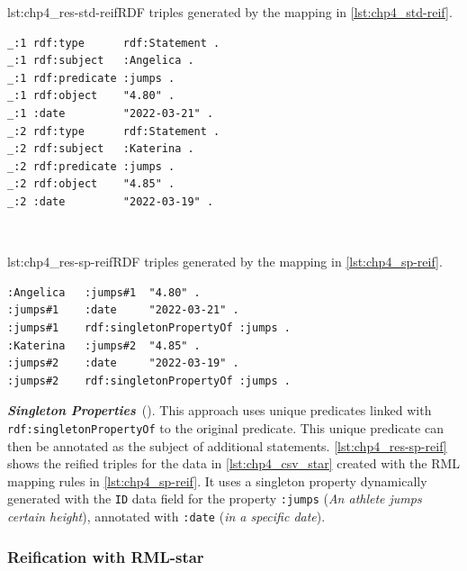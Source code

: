 \begin{minipage}{0.42\linewidth}
\begin{captionedlisting}{lst:chp4_res-std-reif}{RDF triples generated by the mapping in \cref{lst:chp4_std-reif}.}
\centering
{\begin{lstlisting}[basicstyle=\ttfamily\small,label={list:example1},columns=flexible]
_:1 rdf:type      rdf:Statement .
_:1 rdf:subject   :Angelica .
_:1 rdf:predicate :jumps .
_:1 rdf:object    "4.80" .
_:1 :date         "2022-03-21" .
_:2 rdf:type      rdf:Statement .
_:2 rdf:subject   :Katerina .
_:2 rdf:predicate :jumps .
_:2 rdf:object    "4.85" .
_:2 :date         "2022-03-19" .
\end{lstlisting}}
\end{captionedlisting}
\end{minipage}
\,\,\,\,
\begin{minipage}{0.5\linewidth}
\begin{captionedlisting}{lst:chp4_res-sp-reif}{RDF triples generated by the mapping in \cref{lst:chp4_sp-reif}.}
\centering
{\begin{lstlisting}[basicstyle=\ttfamily\small,label={list:example1},columns=flexible]
:Angelica   :jumps#1  "4.80" .
:jumps#1    :date     "2022-03-21" .
:jumps#1    rdf:singletonPropertyOf :jumps .
:Katerina   :jumps#2  "4.85" .
:jumps#2    :date     "2022-03-19" .
:jumps#2    rdf:singletonPropertyOf :jumps .
\end{lstlisting}}
\end{captionedlisting}
\end{minipage}

\noindent\textbf{\textit{Singleton Properties}}~(\cite{nguyen2014don}). This approach uses unique predicates linked with \texttt{rdf:singletonPropertyOf} to the original predicate. 
This unique predicate can then be annotated as the subject of additional statements. 
\cref{lst:chp4_res-sp-reif} shows the reified triples for the data in \cref{lst:chp4_csv_star} created with the RML mapping rules in \cref{lst:chp4_sp-reif}. 
It uses a singleton property dynamically generated with the \texttt{ID} data field for the property \texttt{:jumps} (\textit{An athlete jumps certain height}), annotated with \texttt{:date} (\textit{in a specific date}).








\subsubsection{Reification with RML-star}

